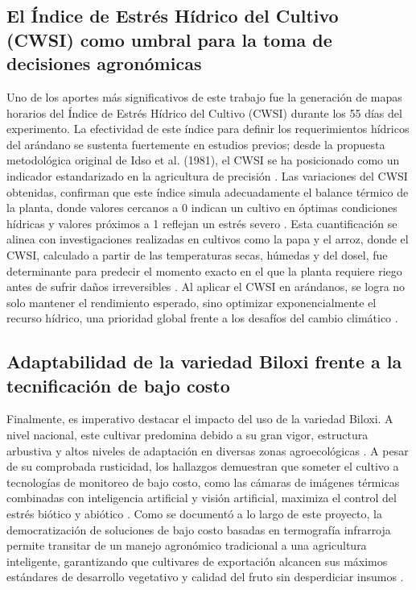 \subsection*{El Índice de Estrés Hídrico del Cultivo (CWSI) como umbral para la toma de decisiones agronómicas}
Uno de los aportes más significativos de este trabajo fue la generación de mapas horarios del Índice de Estrés Hídrico del Cultivo (CWSI) durante los 55 días del experimento. La efectividad de este índice para definir los requerimientos hídricos del arándano se sustenta fuertemente en estudios previos; desde la propuesta metodológica original de Idso et al. (1981), el CWSI se ha posicionado como un indicador estandarizado en la agricultura de precisión . Las variaciones del CWSI obtenidas, confirman que este índice simula adecuadamente el balance térmico de la planta, donde valores cercanos a 0 indican un cultivo en óptimas condiciones hídricas y valores próximos a 1 reflejan un estrés severo . Esta cuantificación se alinea con investigaciones realizadas en cultivos como la papa y el arroz, donde el CWSI, calculado a partir de las temperaturas secas, húmedas y del dosel, fue determinante para predecir el momento exacto en el que la planta requiere riego antes de sufrir daños irreversibles . Al aplicar el CWSI en arándanos, se logra no solo mantener el rendimiento esperado, sino optimizar exponencialmente el recurso hídrico, una prioridad global frente a los desafíos del cambio climático .

\subsection*{Adaptabilidad de la variedad Biloxi frente a la tecnificación de bajo costo}
Finalmente, es imperativo destacar el impacto del uso de la variedad Biloxi. A nivel nacional, este cultivar predomina debido a su gran vigor, estructura arbustiva y altos niveles de adaptación en diversas zonas agroecológicas . A pesar de su comprobada rusticidad, los hallazgos demuestran que someter el cultivo a tecnologías de monitoreo de bajo costo, como las cámaras de imágenes térmicas combinadas con inteligencia artificial y visión artificial, maximiza el control del estrés biótico y abiótico . Como se documentó a lo largo de este proyecto, la democratización de soluciones de bajo costo basadas en termografía infrarroja permite transitar de un manejo agronómico tradicional a una agricultura inteligente, garantizando que cultivares de exportación alcancen sus máximos estándares de desarrollo vegetativo y calidad del fruto sin desperdiciar insumos .


